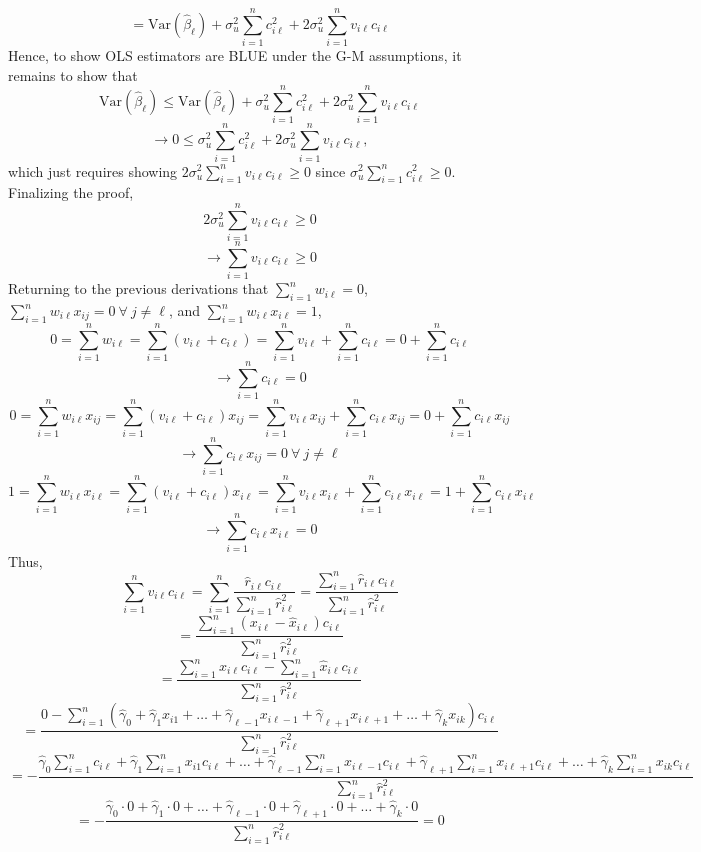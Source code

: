 \documentclass[11pt]{article}
\begin{document}
$$=\text{Var}\left(\hat{\beta}_\ell\right)+\sigma_u^2\sum_{i=1}^{n}c_{i\ell}^2+2\sigma_u^2\sum_{i=1}^{n}v_{i\ell}c_{i\ell}$$
Hence, to show OLS estimators are BLUE under the G-M assumptions, it remains to show that
$$\text{Var}\left(\hat{\beta}_\ell\right)\leq\text{Var}\left(\hat{\beta}_\ell\right)+\sigma_u^2\sum_{i=1}^{n}c_{i\ell}^2+2\sigma_u^2\sum_{i=1}^{n}v_{i\ell}c_{i\ell}$$
$$\to 0\leq\sigma_u^2\sum_{i=1}^{n}c_{i\ell}^2+2\sigma_u^2\sum_{i=1}^{n}v_{i\ell}c_{i\ell},$$
which just requires showing $2\sigma_u^2\sum_{i=1}^{n}v_{i\ell}c_{i\ell}\geq 0$ since $\sigma_u^2\sum_{i=1}^{n}c_{i\ell}^2\geq 0$.
Finalizing the proof,
$$2\sigma_u^2\sum_{i=1}^{n}v_{i\ell}c_{i\ell}\geq 0$$
$$\to\sum_{i=1}^{n}v_{i\ell}c_{i\ell}\geq 0$$
Returning to the previous derivations that $\sum_{i=1}^{n}w_{i\ell}=0$, $\sum_{i=1}^{n}w_{i\ell}x_{ij}=0\ \forall \ j\neq\ell$, and $\sum_{i=1}^{n}w_{i\ell}x_{i\ell}=1$,
$$0=\sum_{i=1}^{n}w_{i\ell}=\sum_{i=1}^{n}\left(v_{i\ell}+c_{i\ell}\right)=\sum_{i=1}^{n}v_{i\ell}+\sum_{i=1}^{n}c_{i\ell}=0+\sum_{i=1}^{n}c_{i\ell}$$
$$\to \sum_{i=1}^{n}c_{i\ell}=0$$
$$0=\sum_{i=1}^{n}w_{i\ell}x_{ij}=\sum_{i=1}^{n}\left(v_{i\ell}+c_{i\ell}\right)x_{ij}=\sum_{i=1}^{n}v_{i\ell}x_{ij}+\sum_{i=1}^{n}c_{i\ell}x_{ij}=0+\sum_{i=1}^{n}c_{i\ell}x_{ij}$$
$$\to\sum_{i=1}^{n}c_{i\ell}x_{ij}=0 \ \forall\  j\neq\ell$$
$$1=\sum_{i=1}^{n}w_{i\ell}x_{i\ell}=\sum_{i=1}^{n}\left(v_{i\ell}+c_{i\ell}\right)x_{i\ell}=\sum_{i=1}^{n}v_{i\ell}x_{i\ell}+\sum_{i=1}^{n}c_{i\ell}x_{i\ell}=1+\sum_{i=1}^{n}c_{i\ell}x_{i\ell}$$
$$\to\sum_{i=1}^{n}c_{i\ell}x_{i\ell}=0$$
Thus,
$$\sum_{i=1}^{n}v_{i\ell}c_{i\ell}=\sum_{i=1}^{n}\frac{\hat{r}_{i\ell}c_{i\ell}}{\sum_{i=1}^{n}\hat{r}_{i\ell}^2}=\frac{\sum_{i=1}^{n}\hat{r}_{i\ell}c_{i\ell}}{\sum_{i=1}^{n}\hat{r}_{i\ell}^2}$$
$$=\frac{\sum_{i=1}^{n}\left(x_{i\ell}-\hat{x}_{i\ell}\right)c_{i\ell}}{\sum_{i=1}^{n}\hat{r}_{i\ell}^2}$$
$$=\frac{\sum_{i=1}^{n}x_{i\ell}c_{i\ell}-\sum_{i=1}^{n}\hat{x}_{i\ell}c_{i\ell}}{\sum_{i=1}^{n}\hat{r}_{i\ell}^2}$$
$$=\frac{0-\sum_{i=1}^{n}\left(\hat{\gamma}_0+\hat{\gamma}_1x_{i1}+\dots+\hat{\gamma}_{\ell-1}x_{i\ell-1}+\hat{\gamma}_{\ell+1}x_{i\ell+1}+\dots+\hat{\gamma}_kx_{ik}\right)c_{i\ell}}{\sum_{i=1}^{n}\hat{r}_{i\ell}^2}$$
$$=-\frac{\hat{\gamma}_0\sum_{i=1}^{n}c_{i\ell}+\hat{\gamma}_1\sum_{i=1}^{n}x_{i1}c_{i\ell}+\dots+\hat{\gamma}_{\ell-1}\sum_{i=1}^{n}x_{i\ell-1}c_{i\ell}+\hat{\gamma}_{\ell+1}\sum_{i=1}^{n}x_{i\ell+1}c_{i\ell}+\dots+\hat{\gamma}_k\sum_{i=1}^{n}x_{ik}c_{i\ell}}{\sum_{i=1}^{n}\hat{r}_{i\ell}^2}$$
$$=-\frac{\hat{\gamma}_0\cdot 0+\hat{\gamma}_1\cdot 0+\dots+\hat{\gamma}_{\ell-1}\cdot 0+\hat{\gamma}_{\ell+1}\cdot 0+\dots+\hat{\gamma}_k\cdot 0}{\sum_{i=1}^{n}\hat{r}_{i\ell}^2}=0$$
\end{document}
